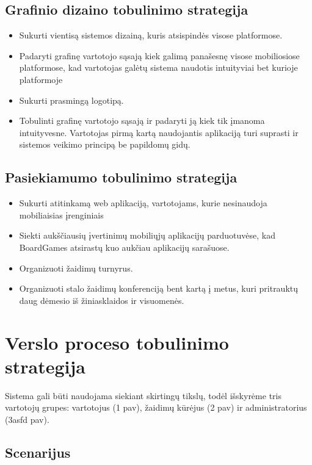 \documentclass{VUMIFPSkursinis}
\begin{document}
	\subsection {Grafinio dizaino tobulinimo strategija}
		\renewcommand{\labelitemi}{$\bullet$}
			\begin{itemize}
				\item Sukurti vientisą sistemos dizainą, kuris atsispindės visose platformose.
				\item Padaryti grafinę vartotojo sąsają kiek galimą panašesnę visose mobiliosiose platformose, kad vartotojas galėtų sistema naudotis intuityviai bet kurioje platformoje
				\item Sukurti prasmingą logotipą.
				\item Tobulinti grafinę vartotojo sąsają ir padaryti ją kiek tik įmanoma intuityvesne. Vartotojas pirmą kartą naudojantis aplikaciją turi suprasti ir sistemos veikimo principą be papildomų gidų. 
			\end{itemize}		
	\subsection {Pasiekiamumo tobulinimo strategija}
		\renewcommand{\labelitemi}{$\bullet$}
			\begin{itemize}
				\item Sukurti atitinkamą web aplikaciją, vartotojams, kurie nesinaudoja mobiliaisias įrenginiais
				\item Siekti aukščiausių įvertinimų mobiliųjų aplikacijų parduotuvėse, kad BoardGames atsirastų kuo aukčiau aplikacijų sarašuose.
				\item Organizuoti žaidimų turnyrus.
				\item Organizuoti stalo žaidimų konferenciją bent kartą į metus, kuri pritrauktų daug dėmesio iš žiniasklaidos ir visuomenės. 
			\end{itemize}			
\section{Verslo proceso tobulinimo strategija}
Sistema gali būti naudojama siekiant skirtingų tikslų, todėl išskyrėme tris 
vartotojų grupes: vartotojus (1 pav), žaidimų kūrėjus (2 pav) ir administratorius 
(3asfd pav).
	\subsection {Scenarijus}
\end{document}
